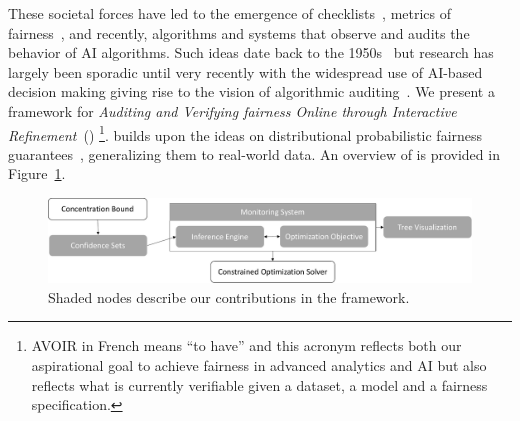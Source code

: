 These societal forces have led to the emergence of checklists~\citep{mitchell2019model,sokol2020explainability}, metrics of fairness~\citep{verma2018fairness}, and recently, algorithms and systems that observe and audits the behavior of %
AI algorithms.  %
Such ideas date back to the 1950s~\citep{moore1956gedanken} %
but research has largely been sporadic until very recently with the widespread use of AI-based decision making giving rise to the vision of algorithmic auditing~\citep{clavell2020auditing}.
We present a framework for {\it Auditing and Verifying fairness Online through Interactive Refinement}~(\AVOIRmethodname{})
\footnote{AVOIR in French means ``to have'' and this acronym reflects both our aspirational goal to achieve fairness in advanced analytics and AI but also reflects what is currently verifiable given a dataset, a model and a fairness specification.}.
\AVOIRmethodname{} builds upon the ideas on distributional probabilistic fairness guarantees~\citep{albarghouthi2019fairness,bastani2019probabilistic}, generalizing them to real-world data. 
An overview of \AVOIRmethodname{} is provided in Figure~\ref{fig:framework}.

\begin{figure}[ht]
    \centering
    \includegraphics[width=0.7\linewidth]{avoir/images/Framework.pdf}
    \caption{Shaded nodes describe our contributions in the \AVOIRmethodname{} framework.}
    \label{fig:framework}
\end{figure}

